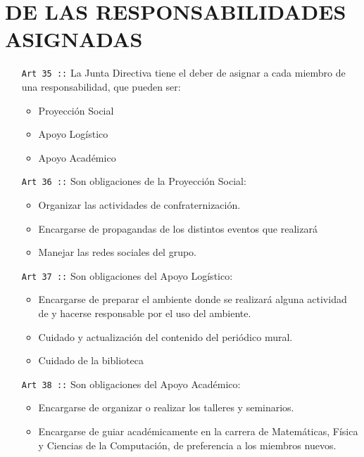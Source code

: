 \chapter{DE LAS RESPONSABILIDADES ASIGNADAS}
\begin{itemize}
  \item [\texttt{Art 35 ::}] La Junta Directiva tiene el deber de asignar a cada miembro de \flae una responsabilidad, que pueden ser:
  \begin{itemize}
    \item Proyección Social
    \item Apoyo Logístico
    \item Apoyo Académico
  \end{itemize}
  \item [\texttt{Art 36 ::}] Son obligaciones de la Proyección Social:
  \begin{itemize}
    \item Organizar las actividades de confraternización.
    \item Encargarse de propagandas de los distintos eventos que realizará \flae
    \item Manejar las redes sociales del grupo.
  \end{itemize}
  \item [\texttt{Art 37 ::}] Son obligaciones del Apoyo Logístico:
  \begin{itemize}
    \item  Encargarse de preparar el ambiente donde se realizará alguna actividad de \flae y hacerse responsable por el uso del ambiente.
    \item Cuidado y actualización del contenido del periódico mural.
    \item Cuidado de la biblioteca \flae

  \end{itemize}
  \item [\texttt{Art 38 ::}] Son obligaciones del Apoyo Académico:
  \begin{itemize}
    \item Encargarse de organizar o realizar los talleres y seminarios.
    \item Encargarse de guiar académicamente en la carrera de Matemáticas, Física y Ciencias de la Computación, de preferencia a los miembros nuevos.
  \end{itemize}
  
\end{itemize}
